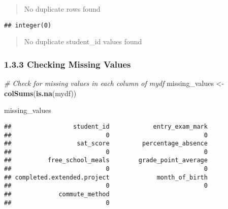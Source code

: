 \documentclass[
]{article}
\newenvironment{Shaded}{\begin{snugshade}}{\end{snugshade}}
\newcommand{\CommentTok}[1]{\textcolor[rgb]{0.56,0.35,0.01}{\textit{#1}}}
\newcommand{\FunctionTok}[1]{\textcolor[rgb]{0.13,0.29,0.53}{\textbf{#1}}}
\newcommand{\NormalTok}[1]{#1}
\newcommand{\OtherTok}[1]{\textcolor[rgb]{0.56,0.35,0.01}{#1}}
\newcommand{\SpecialCharTok}[1]{\textcolor[rgb]{0.81,0.36,0.00}{\textbf{#1}}}
\begin{document}
\begin{quote}
No duplicate rows found
\end{quote}

\begin{Shaded}
\end{Shaded}

\begin{verbatim}
## integer(0)
\end{verbatim}

\begin{quote}
No duplicate student\_id values found
\end{quote}

\subsubsection{1.3.3 Checking Missing
Values}\label{checking-missing-values}

\begin{Shaded}
\begin{Highlighting}[]
\CommentTok{\# Check for missing values in each column of mydf}
\NormalTok{missing\_values }\OtherTok{\textless{}{-}} \FunctionTok{colSums}\NormalTok{(}\FunctionTok{is.na}\NormalTok{(mydf))}

\NormalTok{missing\_values}
\end{Highlighting}
\end{Shaded}

\begin{verbatim}
##                 student_id            entry_exam_mark 
##                          0                          0 
##                  sat_score         percentage_absence 
##                          0                          0 
##          free_school_meals        grade_point_average 
##                          0                          0 
## completed.extended.project             month_of_birth 
##                          0                          0 
##             commute_method 
##                          0
\end{verbatim}
\end{document}
